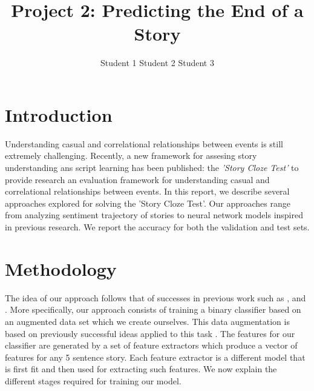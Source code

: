 \documentclass{article}
\title{Project 2: Predicting the End of a Story}
\author{Student 1 \qquad Student 2 \qquad Student 3}
\begin{document}

\maketitle



\section{Introduction}
\label{sec:intro}

Understanding casual and correlational relationships between events is
still extremely challenging. Recently, a new framework for assesing story
understanding ans script learning has been published: the {\it 'Story Cloze
    Test'} to provide research an evaluation framework for understanding casual
and correlational relationships between events. In this report, we describe
several approaches explored for solving the 'Story Cloze Test'. Our approaches
range from analyzing sentiment trajectory of stories to neural network models
inspired in previous research. We report the accuracy for both the validation
and test sets.


\section{Methodology}
\label{sec:general}

The idea of our approach follows that of successes in previous work such as
\cite{UWNLP}, \cite{Goel} and \cite{COGCOMP}. More specifically, our approach
consists of training a binary classifier based on an augmented data set which we
create ourselves. This data augmentation is based on previously successful ideas
applied to this task \cite{LSTMClassifier, SENTENCE_EMB}.  The features for our
classifier are generated by a set of feature extractors which produce a vector
of features for any 5 sentence story. Each feature extractor is a different
model that is first fit and then used for extracting such features. We now 
explain the different stages required for training our model.
\end{document}
